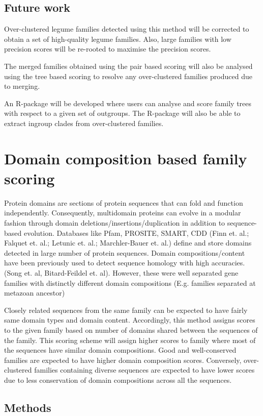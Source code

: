 \documentclass{article}
\begin{document}
		
		\subsection{Future work}
		Over-clustered legume families detected using this method will be corrected to obtain a set of high-quality legume families. Also, large families with low precision scores will be re-rooted to maximise the precision scores.
		
		The merged families obtained using the pair based scoring will also be analysed using the tree based scoring to resolve any over-clustered families produced due to merging.
		
		An R-package will be developed where users can analyse and score family trees with respect to a given set of outgroups. The R-package will also be able to extract ingroup clades from over-clustered families.
		
	\section{Domain composition based family scoring}
	Protein domains are sections of protein sequences that can fold and function independently. Consequently, multidomain proteins can evolve in a modular fashion through domain deletions/insertions/duplication in addition to sequence-based evolution. Databases like Pfam, PROSITE, SMART, CDD (Finn et. al.; Falquet et. al.; Letunic et. al.; Marchler-Bauer et. al.) define and store domains detected in large number of protein sequences. Domain compositions/content have been previously used to detect sequence homology with high accuracies. (Song et. al, Bitard-Feildel et. al). However, these were well separated gene families with distinctly different domain compositions (E.g. families separated at metazoan ancestor)
	
	Closely related sequences from the same family can be expected to have fairly same domain types and domain content. Accordingly, this method assigns scores to the given family based on number of domains shared between the sequences of the family. This scoring scheme will assign higher scores to family where most of the sequences have similar domain compositions. Good and well-conserved families are expected to have higher domain composition scores. Conversely, over-clustered families containing diverse sequences are expected to have lower scores due to less conservation of domain compositions across all the sequences.
	
	\subsection{Methods}
\end{document}
